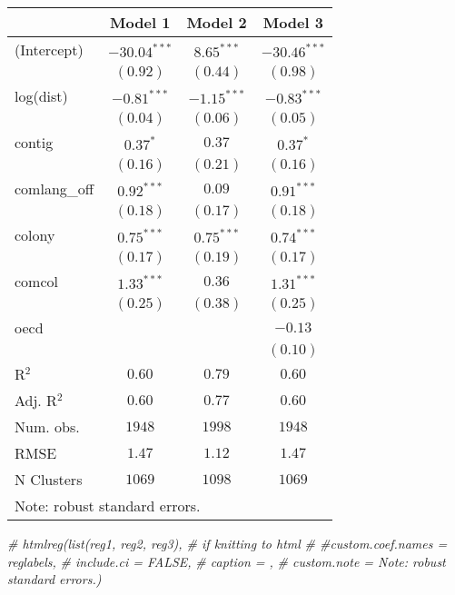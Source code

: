\documentclass[
]{article}
\newenvironment{Shaded}{\begin{snugshade}}{\end{snugshade}}
\newcommand{\CommentTok}[1]{\textcolor[rgb]{0.56,0.35,0.01}{\textit{#1}}}
\begin{document}
\begin{table}
\begin{center}
\begin{tabular}{l c c c}
\hline
 & Model 1 & Model 2 & Model 3 \\
\hline
(Intercept)  & $-30.04^{***}$ & $8.65^{***}$  & $-30.46^{***}$ \\
             & $(0.92)$       & $(0.44)$      & $(0.98)$       \\
log(dist)    & $-0.81^{***}$  & $-1.15^{***}$ & $-0.83^{***}$  \\
             & $(0.04)$       & $(0.06)$      & $(0.05)$       \\
contig       & $0.37^{*}$     & $0.37$        & $0.37^{*}$     \\
             & $(0.16)$       & $(0.21)$      & $(0.16)$       \\
comlang\_off & $0.92^{***}$   & $0.09$        & $0.91^{***}$   \\
             & $(0.18)$       & $(0.17)$      & $(0.18)$       \\
colony       & $0.75^{***}$   & $0.75^{***}$  & $0.74^{***}$   \\
             & $(0.17)$       & $(0.19)$      & $(0.17)$       \\
comcol       & $1.33^{***}$   & $0.36$        & $1.31^{***}$   \\
             & $(0.25)$       & $(0.38)$      & $(0.25)$       \\
oecd         &                &               & $-0.13$        \\
             &                &               & $(0.10)$       \\
\hline
R$^2$        & $0.60$         & $0.79$        & $0.60$         \\
Adj. R$^2$   & $0.60$         & $0.77$        & $0.60$         \\
Num. obs.    & $1948$         & $1998$        & $1948$         \\
RMSE         & $1.47$         & $1.12$        & $1.47$         \\
N Clusters   & $1069$         & $1098$        & $1069$         \\
\hline
\multicolumn{4}{l}{\scriptsize{Note: robust standard errors.}}
\end{tabular}
\caption{}
\label{table:coefficients}
\end{center}
\end{table}

\begin{Shaded}
\begin{Highlighting}[]
\CommentTok{\# htmlreg(list(reg1, reg2, reg3),  \# if knitting to html}
\CommentTok{\# \#custom.coef.names = reglabels,}
\CommentTok{\# include.ci = FALSE,}
\CommentTok{\# caption = \textquotesingle{}\textquotesingle{},}
\CommentTok{\# custom.note = \textquotesingle{}Note: robust standard errors.\textquotesingle{})}
\end{Highlighting}
\end{Shaded}
\end{document}
